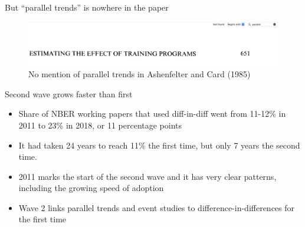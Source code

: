 \documentclass{beamer}
\begin{document}
\begin{frame}{But ``parallel trends'' is nowhere in the paper}

	\begin{figure}
	\caption{No mention of parallel trends in Ashenfelter and Card (1985)}
	\includegraphics[scale=0.2]{./lecture_includes/nomention.png}
	\end{figure}

\end{frame}




\begin{frame}{Second wave grows faster than first}

\begin{itemize}
\item Share of NBER working papers that used diff-in-diff went from 11-12\% in 2011 to 23\% in 2018, or 11 percentage points
\item It had taken 24 years to reach 11\% the first time, but only 7 years the second time. 
\item 2011 marks the start of the second wave and it has very clear patterns, including the growing speed of adoption
\item Wave 2 links parallel trends and event studies to difference-in-differences for the first time
\end{itemize}

\end{frame}
\end{document}
